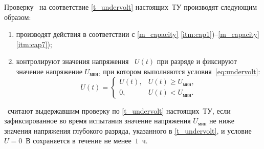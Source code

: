 Проверку \dut \ на соответствие \ref{t_undervolt} настоящих~ТУ производят следующим образом:
%
\begin{enumerate}
	\item производят действия в соответствии с \ref{m_capacity} \ref{itm:cap1})--\ref{m_capacity} \ref{itm:cap7});
	\item контролируют значения напряжения \dut \ $U(t)$ при разряде и фиксируют значение напряжение $U_\text{мин}$, при котором выполняются условия~\eqref{eq:undervolt}:
		\begin{equation}\label{eq:undervolt}
			U(t) = \left\{\begin{array}{rl}
							U(t), & U(t) \geqslant U_\text{мин},\\
							0, & U(t) < U_\text{мин}.
						\end{array}
				\right.
		\end{equation}
\end{enumerate}

\dut \ считают выдержавшим проверку по \ref{t_undervolt} настоящих~ТУ, если зафиксированное во время испытания значение напряжения $U_\text{мин}$ не ниже значения напряжения глубокого разряда, указанного в \ref{t_undervolt}, и условие $U = 0$~В сохраняется в течение не менее~$1$~ч.